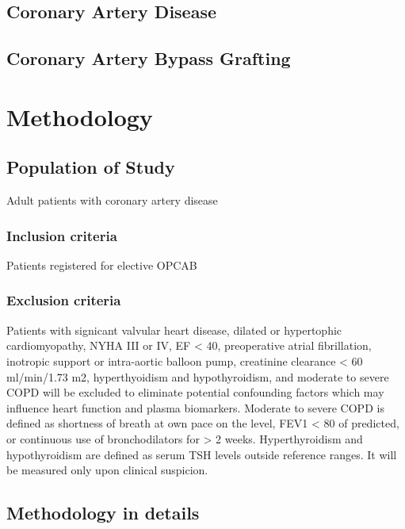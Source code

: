 \documentclass[12pt,a4paper,onecolumn]{article}
\begin{document}
\subsection{Coronary Artery Disease}
\subsection{Coronary Artery Bypass Grafting}

\section{Methodology}

\subsection{Population of Study}

Adult patients with coronary artery disease

\subsubsection{Inclusion criteria}

Patients registered for elective OPCAB

\subsubsection{Exclusion criteria}

Patients with signicant valvular heart disease, dilated or hypertophic cardiomyopathy, NYHA III or IV, EF < 40, preoperative atrial fibrillation, inotropic support or intra-aortic balloon pump, creatinine clearance < 60 ml/min/1.73 m2, hyperthyoidism and hypothyroidism, and moderate to severe COPD will be excluded to eliminate potential confounding factors which may influence heart function and plasma biomarkers.  Moderate to severe COPD is defined as shortness of breath at own pace on the level, FEV1 < 80 of predicted, or continuous use of bronchodilators for > 2 weeks.  Hyperthyroidism and hypothyroidism are defined as serum TSH levels outside reference ranges.  It will be measured only upon clinical suspicion.

\subsection{Methodology in details}
\end{document}
